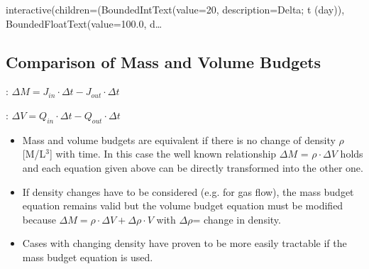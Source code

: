 \documentclass[letterpaper,10pt,english]{sphinxmanual}
\begin{document}
\begin{sphinxVerbatim}[commandchars=\\\{\}]
          
  \PYG{p}{[}\PYG{p}{]}  
\end{sphinxVerbatim}

\begin{sphinxVerbatim}[commandchars=\\\{\}]
interactive(children=(BoundedIntText(value=20, description=\PYGZsq{}\PYGZam{}Delta; t (day)\PYGZsq{}), BoundedFloatText(value=100.0, d…
\end{sphinxVerbatim}


\subsection{Comparison of Mass and Volume Budgets}
\label{\detokenize{contents/background/03_basic_hydrogeology:comparison-of-mass-and-volume-budgets}}
:	\(\Delta M = J_{in} \cdot \Delta t - J_{out} \cdot \Delta t\)

:	\(\Delta V = Q_{in} \cdot \Delta t - Q_{out} \cdot \Delta t \)
\begin{itemize}
\item {} 
Mass and volume budgets are equivalent if there is no change of density \(\rho\) {[}M/L\(^3\){]} with time. In this case the well known relationship \(\Delta M\) = \(\rho \cdot \Delta V\) holds and each equation given above can be directly transformed into the other one.

\item {} 
If density changes have to be considered (e.g. for gas flow), the mass budget equation remains valid but the volume budget equation must be modified because \(\Delta M = \rho \cdot \Delta V + \Delta \rho \cdot V\) with \(\Delta \rho\)= change in density.

\item {} 
Cases with changing density have proven to be more easily tractable if the mass budget equation is used.

\end{itemize}
\end{document}
